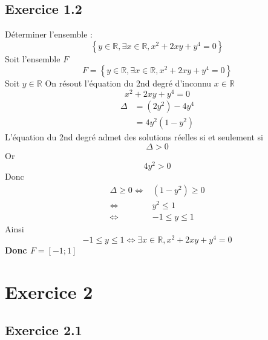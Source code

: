 \documentclass[a4paper,12pt]{article}
\begin{document}
\subsection{Exercice 1.2}
Déterminer l'ensemble :
\[
 \left\{ y \in \mathbb{R}, \exists x \in \mathbb{R}, x^2 + 2xy + y^4 = 0 \right\}
\]
Soit l'ensemble $F$
\[
F = \left\{ y \in \mathbb{R}, \exists x \in \mathbb{R}, x^2 + 2xy + y^4 = 0 \right\}
\]
Soit $y \in \mathbb{R}$
On résout l'équation du 2nd degré d’inconnu $x \in \mathbb{R}$
\[
x^2 + 2xy + y^4 = 0
\]
\[
\begin{aligned}
\Delta &= (2y^2) - 4y^4\\
&= 4y^2 (1 - y^2)
\end{aligned}
\]
L'équation du 2nd degré admet des solutions réelles si et seulement si 
\[
\Delta > 0
\]
Or
\[
4y^2 > 0
\]
Donc 
\[
\begin{aligned}
\Delta \ge 0  \Leftrightarrow & (1-y^2) \ge 0\\
\Leftrightarrow& y^2 \le 1\\
\Leftrightarrow& -1 \le y \le 1
\end{aligned}
\]
Ainsi
\[
-1 \le y \le 1 \Leftrightarrow \exists x \in \mathbb{R}, x^2 + 2xy + y^4 = 0
\]
\textbf{Donc $F = [-1 ; 1]$}
\section{Exercice 2}
\subsection{Exercice 2.1}
\end{document}
